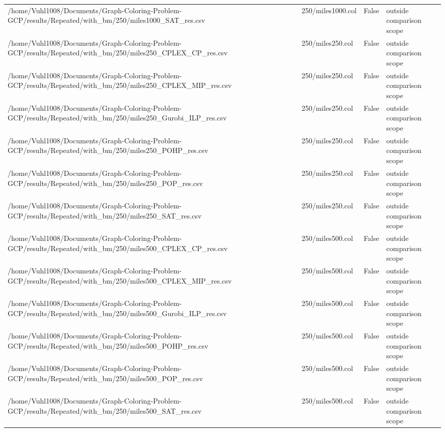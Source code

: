 \begin{table}[htbp]
\begin{tabular}{llll}
/home/Vuhl1008/Documents/Graph-Coloring-Problem-GCP/results/Repeated/with\_bm/250/miles1000\_SAT\_res.csv & 250/miles1000.col & False & outside comparison scope \\
/home/Vuhl1008/Documents/Graph-Coloring-Problem-GCP/results/Repeated/with\_bm/250/miles250\_CPLEX\_CP\_res.csv & 250/miles250.col & False & outside comparison scope \\
/home/Vuhl1008/Documents/Graph-Coloring-Problem-GCP/results/Repeated/with\_bm/250/miles250\_CPLEX\_MIP\_res.csv & 250/miles250.col & False & outside comparison scope \\
/home/Vuhl1008/Documents/Graph-Coloring-Problem-GCP/results/Repeated/with\_bm/250/miles250\_Gurobi\_ILP\_res.csv & 250/miles250.col & False & outside comparison scope \\
/home/Vuhl1008/Documents/Graph-Coloring-Problem-GCP/results/Repeated/with\_bm/250/miles250\_POHP\_res.csv & 250/miles250.col & False & outside comparison scope \\
/home/Vuhl1008/Documents/Graph-Coloring-Problem-GCP/results/Repeated/with\_bm/250/miles250\_POP\_res.csv & 250/miles250.col & False & outside comparison scope \\
/home/Vuhl1008/Documents/Graph-Coloring-Problem-GCP/results/Repeated/with\_bm/250/miles250\_SAT\_res.csv & 250/miles250.col & False & outside comparison scope \\
/home/Vuhl1008/Documents/Graph-Coloring-Problem-GCP/results/Repeated/with\_bm/250/miles500\_CPLEX\_CP\_res.csv & 250/miles500.col & False & outside comparison scope \\
/home/Vuhl1008/Documents/Graph-Coloring-Problem-GCP/results/Repeated/with\_bm/250/miles500\_CPLEX\_MIP\_res.csv & 250/miles500.col & False & outside comparison scope \\
/home/Vuhl1008/Documents/Graph-Coloring-Problem-GCP/results/Repeated/with\_bm/250/miles500\_Gurobi\_ILP\_res.csv & 250/miles500.col & False & outside comparison scope \\
/home/Vuhl1008/Documents/Graph-Coloring-Problem-GCP/results/Repeated/with\_bm/250/miles500\_POHP\_res.csv & 250/miles500.col & False & outside comparison scope \\
/home/Vuhl1008/Documents/Graph-Coloring-Problem-GCP/results/Repeated/with\_bm/250/miles500\_POP\_res.csv & 250/miles500.col & False & outside comparison scope \\
/home/Vuhl1008/Documents/Graph-Coloring-Problem-GCP/results/Repeated/with\_bm/250/miles500\_SAT\_res.csv & 250/miles500.col & False & outside comparison scope \\

\end{tabular}
\end{table}
